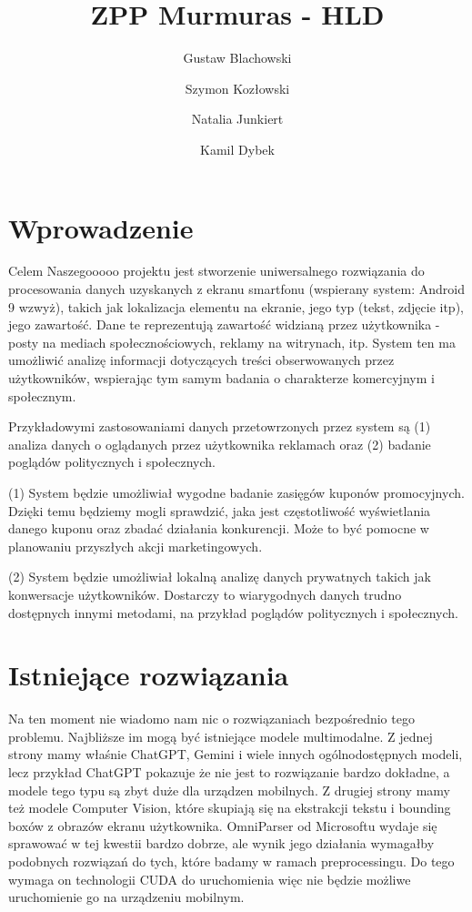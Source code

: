 \documentclass[12pt]{article}
\title{ZPP Murmuras - HLD}
\author{Gustaw Blachowski \and Szymon Kozłowski \and Natalia Junkiert \and Kamil Dybek}
\date{}
\begin{document}
\maketitle

\section*{Wprowadzenie}

Celem Naszegooooo projektu jest stworzenie uniwersalnego rozwiązania do procesowania danych uzyskanych z ekranu smartfonu (wspierany system: Android 9 wzwyż), takich jak lokalizacja elementu na ekranie, jego typ (tekst, zdjęcie itp), jego zawartość.
Dane te reprezentują zawartość widzianą przez użytkownika - posty na mediach społecznościowych, reklamy na witrynach, itp.
System ten ma umożliwić analizę informacji dotyczących treści obserwowanych przez użytkowników, wspierając tym samym badania o charakterze komercyjnym i społecznym.

Przykładowymi zastosowaniami danych przetowrzonych przez system są (1) analiza danych o oglądanych przez użytkownika reklamach oraz (2) badanie poglądów politycznych i społecznych.

(1) System będzie umożliwiał wygodne badanie zasięgów kuponów promocyjnych. Dzięki temu będziemy mogli sprawdzić, jaka jest częstotliwość wyświetlania danego kuponu oraz zbadać działania konkurencji. Może to być pomocne w planowaniu przyszłych akcji marketingowych.

(2) System będzie umożliwiał lokalną analizę danych prywatnych takich jak konwersacje użytkowników. Dostarczy to wiarygodnych danych trudno dostępnych innymi metodami, na przykład poglądów politycznych i społecznych.


\section*{Istniejące rozwiązania}
Na ten moment nie wiadomo nam nic o rozwiązaniach bezpośrednio tego problemu. Najbliższe im mogą być istniejące modele multimodalne.
Z jednej strony mamy właśnie ChatGPT, Gemini i wiele innych ogólnodostępnych modeli, lecz przykład ChatGPT pokazuje że nie jest to rozwiązanie bardzo dokładne, a modele tego typu są zbyt duże dla urządzen mobilnych. Z drugiej strony mamy też modele Computer Vision, które skupiają się na ekstrakcji tekstu i bounding boxów z obrazów ekranu użytkownika. OmniParser od Microsoftu wydaje się sprawować w tej kwestii bardzo dobrze, ale wynik jego działania wymagałby podobnych rozwiązań do tych, które badamy w ramach preprocessingu. Do tego wymaga on technologii CUDA do uruchomienia więc nie będzie możliwe uruchomienie go na urządzeniu mobilnym.
\end{document}

